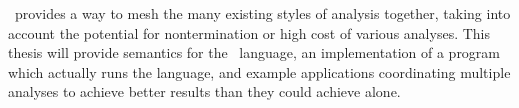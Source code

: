 \sysname\ provides a way to mesh the many existing styles of analysis together, taking into account the potential for nontermination or high cost of various analyses. This thesis will provide semantics for the \sysname\ language, an implementation of a program which actually runs the language, and example applications coordinating multiple analyses to achieve better results than they could achieve alone.
